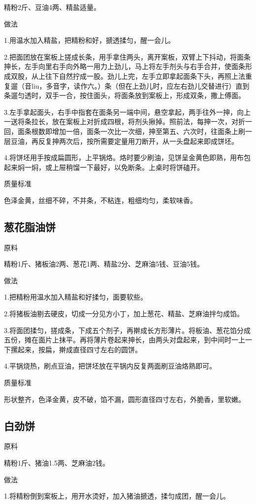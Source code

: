\documentclass{ctexbook}
\begin{document}
精粉2斤、豆油4两、精盐适量。

做法

1.用温水加入精盐，把精粉和好，搋透揉匀，醒一会儿。

2.把面团放在案板上搓成长条，用手拿住两头，离开案板，双臂上下抖动，将面条抻长，左手向里右手向外略一用力上劲儿，马上将左手剂头与右手合并，使面条形成双股，从上往下自然拧成一股。劲儿上完，左手立即拿起面条下头，再照上法重复遛（音liu，多音字，读作六。）条（但在上劲儿时，应左右劲儿交替进行）直到条遛匀透时，双手一合，按住面头，将面条放到案板上，形成双条，撒上傅面。

3.左手拿起面头，右手中指套在面条另一端中间，悬空拿起，两手往外一抻，向上一送将条拉长，放在案板上对折成四根，将剂头揪掉。照前法，每抻一次，对折一回，面条根数即增加一倍，面条一次比一次细，抻至第五、六次时，往面条上刷一层豆油，再反复抻两次后，按所需要定量用刀断开，从一头盘起来即成饼坯。

4.将饼坯用手按成扁圆形，上平锅烙。烙时要少刷油，见饼呈金黄色即熟，用布包起来焖一焖，或上屉稍馏一下最好，以免断条。上桌时将饼磕开。

质量标准

色泽金黄，丝细不碎，不并条，不粘连，粗细均匀，柔软味香。
\subsection{葱花脂油饼}
原料

精粉1斤、猪板油2两、葱花1两、精盐2分、芝麻油5钱、豆油5钱。

做法

1.把精粉用温水加入精盐和好揉匀，面要软些。

2.将猪板油剔去硬皮，切成一分见方小丁，加上葱花、精盐、芝麻油拌匀成馅。

3.将面团揉匀，搓成条，下成五个剂子，再擀成长方形薄片。将板油、葱花馅分成五份，摊在面片上抹平。再将薄片卷起来抻长，由两头对盘起来，到中间时一上一下摞起来，按扁，擀成直径四寸左右的圆饼。

4.平锅烧热，刷点豆油，把饼坯放在平锅内反复两面刷豆油烙熟即可。

质量标准

形状整齐，色泽金黄，皮不破，馅不漏，圆形直径四寸左右，外脆香，里软嫩。
\subsection{白劲饼}
原料

精粉1斤、猪油1.5两、芝麻油2钱。

做法

1.将精粉倒到案板上，用开水烫好，加入猪油搋透，揉匀成团，醒一会儿。
\end{document}

